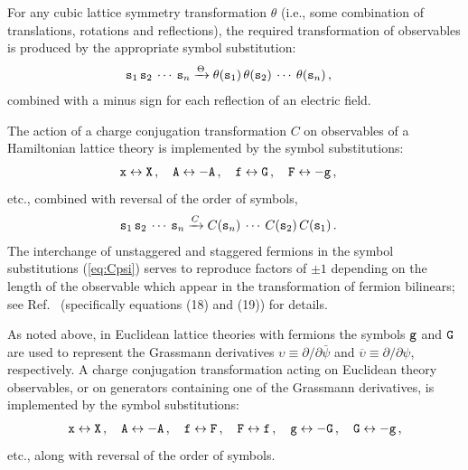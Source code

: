 \documentclass [12pt]{article}
\makeatletter
\renewcommand{\tt}{\begingroup\catcode`_=12\def\_{\string_}\tt@}
\newcommand{\tt@}[1]{\texttt{#1}\endgroup}
\makeatother
\begin{document}
    For any cubic lattice symmetry transformation $\theta$
    (i.e., some combination of translations, rotations and reflections),
    the required transformation of observables is produced by
    the appropriate symbol substitution:
    \begin{align}
	\tt{s}_1 \, \tt{s}_2 \> \cdots \> \tt{s}_n
	&\xrightarrow{\Theta}
	\theta(\tt{s}_1) \, \theta(\tt{s}_2) \> \cdots \> \theta(\tt{s}_n) \,,
    \end{align}
    combined with a minus sign for each reflection of an electric field.

    The action of a charge conjugation transformation $C$ on observables
    of a Hamiltonian lattice theory
    is implemented by the symbol substitutions:
    \begin{align}
	\tt{x} \leftrightarrow \tt{X} \,,\quad
	\tt{A} \leftrightarrow -\tt{A} \,,\quad
	\tt{f} \leftrightarrow \tt{G} \,,\quad
	\tt{F} &\leftrightarrow -\tt{g} \,,
    \label{eq:Cpsi}
    \end{align}
    etc., combined with reversal of the order of symbols,
    \begin{align}
	\tt{s}_1 \, \tt{s}_2 \> \cdots \> \tt{s}_n
	&\xrightarrow{C}
	C(\tt{s}_n) \> \cdots \> C(\tt{s}_2) \, C(\tt{s}_1) \,.
    \end{align}
    The interchange of unstaggered and staggered fermions in the symbol substitutions
    (\ref{eq:Cpsi}) serves to reproduce factors
    of $\pm1$ depending on the length of the observable which appear
    in the transformation of fermion bilinears;
    see Ref.~\cite{latticesymm} (specifically equations (18) and (19)) for details.

    As noted above, in Euclidean lattice theories with fermions
    the symbols $\tt{g}$ and $\tt{G}$ are used to represent
    the Grassmann derivatives
    $\upsilon \equiv \partial/\partial \bar\psi$ and
    $\overline\upsilon \equiv \partial/\partial\psi$, respectively.
    A charge conjugation transformation acting on Euclidean theory observables,
    or on generators containing one of the Grassmann derivatives,
    is implemented by the symbol substitutions:
    \begin{align}
	\tt{x} \leftrightarrow \tt{X} \,,\quad
	\tt{A} \leftrightarrow -\tt{A} \,,\quad
	\tt{f} \leftrightarrow \tt{F} \,,\quad
	\tt{F} \leftrightarrow \tt{f} \,,\quad
	\tt{g} \leftrightarrow -\tt{G} \,,\quad
	\tt{G} \leftrightarrow -\tt{g} \,,
    \label{eq:Cpsieuclid}
    \end{align}
    etc., along with reversal of the order of symbols.
\end{document}
